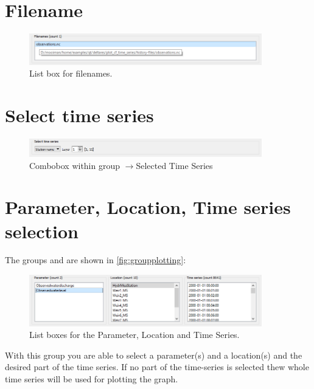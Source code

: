 \documentclass{deltares_memo}
\newcommand{\menuarrow}{$\rightarrow$}
\begin{document}
\section{Filename}
\phantom{m}\vspace{-\baselineskip}
\begin{figure}[H]
    \centering    
    \includegraphics[width=0.9\textwidth]{pictures/group_filenames.png}
    \caption{List box for filenames.}
\end{figure}

\section{Select time series}
\phantom{m}\vspace{-\baselineskip}
\begin{figure}[H]
\centering    
\includegraphics[width=0.9\textwidth]{pictures/group_select_time_series.png}
\caption{Combobox within group \menuarrow{Selected Time Series}}
\end{figure}

\section{Parameter, Location, Time series selection}
The groups   and  are shown in \autoref{fig:groupplotting}:
\begin{figure}[H]
    \centering    
    \includegraphics[width=0.9\textwidth]{pictures/group_parameter_location_time.png}
    \caption{List boxes for the Parameter, Location and Time Series.}
\end{figure}
With this group you are able to select a parameter(s) and a location(s) and the desired part of the time series. 
If no part of the time-series is selected thew whole time series will be used for plotting the graph.
\end{document}
